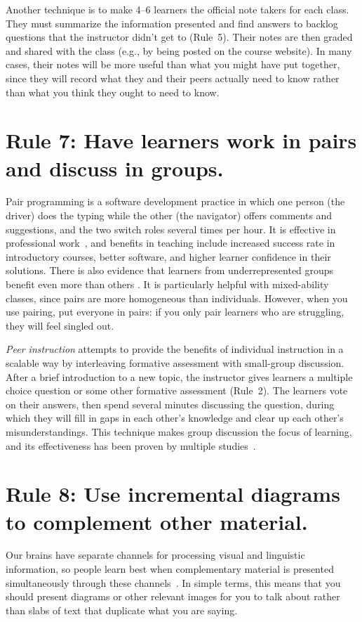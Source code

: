 \documentclass[10pt,letterpaper]{article}
\newcommand{\rulemajor}[1]{\section{#1}}
\begin{document}
Another technique is to make 4--6 learners the official note takers for each class.
They must summarize the information presented
and find answers to backlog questions that the instructor didn't get to (Rule~5).
Their notes are then graded and shared with the class
(e.g., by being posted on the course website).
In many cases,
their notes will be more useful than what you might have put together,
since they will record what they and their peers actually need to know
rather than what you think they ought to need to know.

\rulemajor{Rule 7: Have learners work in pairs and discuss in groups.}

Pair programming is a software development practice
in which one person (the driver) does the typing
while the other (the navigator) offers comments and suggestions,
and the two switch roles several times per hour.
It is effective in professional work~\cite{Hann2009},
and benefits in teaching include increased success rate in introductory courses,
better software,
and higher learner confidence in their solutions.
There is also evidence that learners from underrepresented groups
benefit even more than others \cite{McDo2006,Hank2011,Cele2018}.
It is particularly helpful with mixed-ability classes,
since pairs are more homogeneous than individuals.
However,
when you use pairing,
put everyone in pairs:
if you only pair learners who are struggling,
they will feel singled out.

\emph{Peer instruction} attempts to provide the benefits of individual instruction in a scalable way
by interleaving formative assessment with small-group discussion.
After a brief introduction to a new topic,
the instructor gives learners a multiple choice question or some other formative assessment
(Rule~2).
The learners vote on their answers,
then spend several minutes discussing the question,
during which they will fill in gaps in each other's knowledge
and clear up each other's misunderstandings.
This technique makes group discussion the focus of learning,
and its effectiveness has been proven by multiple studies~\cite{Crou2001,Smit2009,Port2016}.

\rulemajor{Rule 8: Use incremental diagrams to complement other material.}

Our brains have separate channels for
processing visual and linguistic information,
so people learn best when complementary material is presented simultaneously through these channels~\cite{Maye2003,Maye2009}.
In simple terms,
this means that you should present diagrams or other relevant images for you to talk about
rather than slabs of text that duplicate what you are saying.
\end{document}
